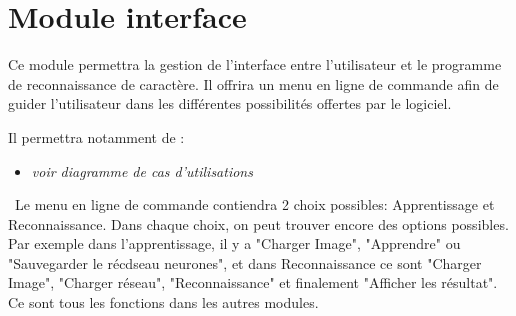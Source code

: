 \section{Module interface}
Ce module permettra la gestion de l'interface entre l'utilisateur et le programme de reconnaissance de caract\`ere. Il offrira un menu en ligne de commande afin de guider l'utilisateur dans les diff\'erentes possibilit\'es offertes par le logiciel.

Il permettra notamment de :
\begin{itemize}
	\item \textit{voir diagramme de cas d'utilisations}
\end{itemize}

\ \newline Le menu en ligne de commande contiendra 2 choix possibles: Apprentissage et Reconnaissance. Dans chaque choix, on peut trouver encore des options possibles. Par exemple dans l'apprentissage, il y a "Charger Image", "Apprendre" ou "Sauvegarder le r\'ecdseau neurones", et dans Reconnaissance ce sont "Charger Image", "Charger réseau", "Reconnaissance" et finalement "Afficher les r\'esultat". Ce sont tous les fonctions dans les autres modules. 
